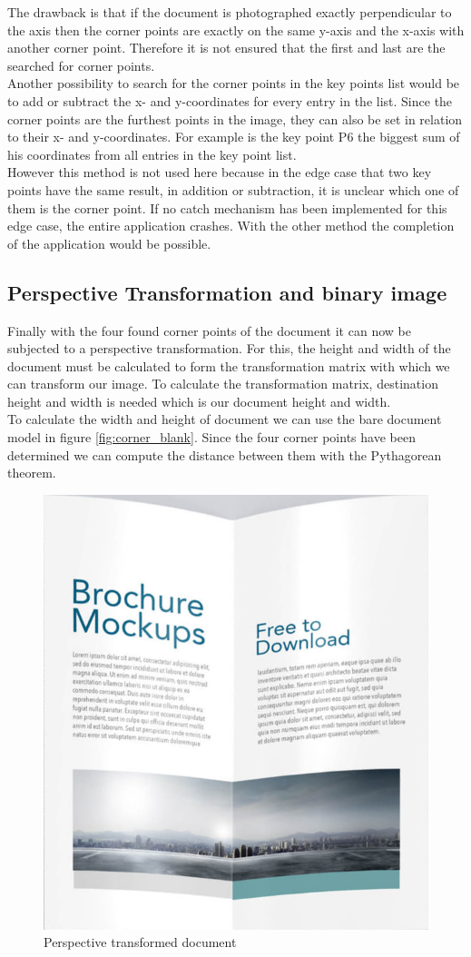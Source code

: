 The drawback is that if the document is photographed exactly perpendicular to the axis then the corner points are exactly on the same y-axis and the x-axis with another corner point. Therefore it is not ensured that the first and last are the searched for corner points.\\

Another possibility to search for the corner points in the key points list would be to add or subtract the x- and y-coordinates for every entry in the list. Since the corner points are the furthest points in the image, they can also be set in relation to their x- and y-coordinates. For example is the key point P6 the biggest sum of his coordinates from all entries in the key point list.\\

However this method is not used here because in the edge case that two key points have the same result, in addition or subtraction, it is unclear which one of them is the corner point. If no catch mechanism has been implemented for this edge case, the entire application crashes. With the other method the completion of the application would be possible.\\

\subsection{Perspective Transformation and binary image}

Finally with the four found corner points of the document it can now be subjected to a perspective transformation. For this, the height and width of the document must be calculated to form the transformation matrix with which we can transform our image. To calculate the transformation matrix, destination height and width is needed which is our document height and width.\\ 

To calculate the width and height of document we can use the bare document model in figure \ref{fig:corner_blank}. Since the four corner points have been determined we can compute the distance between them with the Pythagorean theorem. \\

\begin{figure}
    \centering
    \captionsetup{justification=centering}
    \includegraphics[width=.4\textwidth]{images/3_folded_doc/warped.png}
    \caption{Perspective transformed document}
    \label{fig:doc_warped}
    \vspace{-5mm}
\end{figure}

